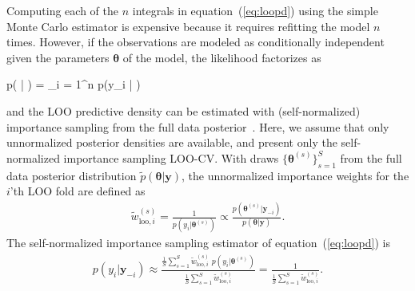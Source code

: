 \documentclass[12pt]{article}
\newenvironment{nalign}{
    \begin{equation}
    \begin{aligned}
}{
    \end{aligned}
    \end{equation}
    \ignorespacesafterend
}
\newenvironment{nalign*}{
    \begin{equation*}
    \begin{aligned}
}{
    \end{aligned}
    \end{equation*}
    \ignorespacesafterend
}
\begin{document}
%
Computing each of the $n$ integrals in equation~(\ref{eq:loopd})
using the simple Monte Carlo estimator is expensive because it
requires refitting the model $n$ times.
However,
if the observations are modeled as conditionally independent given the parameters $\boldsymbol{\theta}$ of the model, the likelihood factorizes as
\begin{nalign*}
	p( | \boldsymbol{\theta}) = \prod_{i = 1}^n p(y_i | \boldsymbol{\theta}) 
\end{nalign*}
and the LOO predictive density can be estimated with (self-normalized) importance sampling from the full data posterior~\citep{gelfand1992model}.
Here, we assume that only unnormalized posterior densities are available, and
present only the self-normalized importance sampling LOO-CV.
With draws $\{ \boldsymbol{\theta}^{(s)} \}_{s=1}^{S} $ from the full data posterior distribution $\widetilde{p} (\boldsymbol{\theta} | \mathbf{y})$,
the unnormalized importance weights for the $i$'th LOO fold are defined as
\begin{nalign} \label{eq:rawisw}
\widetilde{w}_{\text{loo},i}^{(s)} = \frac{1}{p (y_i | \boldsymbol{\theta}^{(s)})} \propto \frac{p (\boldsymbol{\theta}^{(s)} | \mathbf{y}_{-i} )}{p (\boldsymbol{\theta} | \mathbf{y} )} .
\end{nalign}
The self-normalized importance sampling estimator of equation~(\ref{eq:loopd}) is
%
%
%
\begin{nalign} \label{eq:isloosimp}
p (y_i | \mathbf{y}_{-i}) \approx  \frac{ \frac{1}{S} \sum_{s = 1}^{S} \widetilde{w}_{\text{loo},i}^{(s)} \;  p (y_i | \boldsymbol{\theta}^{(s)})   }{ \frac{1}{S} \sum_{s = 1}^{S} \widetilde{w}_{\text{loo},i}^{(s)}} =  \frac{1}{ \frac{1}{S} \sum_{s = 1}^{S} \widetilde{w}_{\text{loo},i}^{(s)}}.
\end{nalign}
\end{document}
